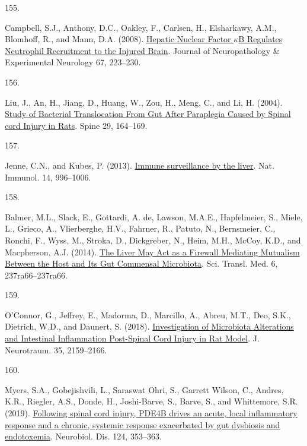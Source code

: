 \documentclass[
]{article}
\newlength{\cslhangindent}
\newlength{\csllabelwidth}
\newlength{\cslentryspacingunit} %
\newenvironment{CSLReferences}[2] %
 {%
  \setlength{\parindent}{0pt}
  \ifodd #1
  \let\oldpar\par
  \def\par{\hangindent=\cslhangindent\oldpar}
  \fi
  \setlength{\parskip}{#2\cslentryspacingunit}
 }%
 {}
\newcommand{\CSLLeftMargin}[1]{\parbox[t]{\csllabelwidth}{#1}}
\newcommand{\CSLRightInline}[1]{\parbox[t]{\linewidth - \csllabelwidth}{#1}\break}
\begin{document}
\begin{CSLReferences}{0}{0}
\leavevmode{}%
\CSLLeftMargin{155. }
\CSLRightInline{Campbell, S.J., Anthony, D.C., Oakley, F., Carlsen, H., Elsharkawy, A.M., Blomhoff, R., and Mann, D.A. (2008). \href{https://doi.org/10.1097/NEN.0b013e3181654957}{Hepatic {Nuclear Factor \(\kappa\)B Regulates Neutrophil Recruitment} to the {Injured Brain}}. Journal of Neuropathology \& Experimental Neurology 67, 223--230.}

\leavevmode{}%
\CSLLeftMargin{156. }
\CSLRightInline{Liu, J., An, H., Jiang, D., Huang, W., Zou, H., Meng, C., and Li, H. (2004). \href{https://doi.org/10.1097/01.BRS.0000107234.74249.CD}{Study of {Bacterial Translocation From Gut After Paraplegia Caused} by {Spinal} cord {Injury} in {Rats}}. Spine 29, 164--169.}

\leavevmode{}%
\CSLLeftMargin{157. }
\CSLRightInline{Jenne, C.N., and Kubes, P. (2013). \href{https://doi.org/10.1038/ni.2691}{Immune surveillance by the liver}. Nat. Immunol. 14, 996--1006.}

\leavevmode{}%
\CSLLeftMargin{158. }
\CSLRightInline{Balmer, M.L., Slack, E., Gottardi, A. de, Lawson, M.A.E., Hapfelmeier, S., Miele, L., Grieco, A., Vlierberghe, H.V., Fahrner, R., Patuto, N., Bernsmeier, C., Ronchi, F., Wyss, M., Stroka, D., Dickgreber, N., Heim, M.H., McCoy, K.D., and Macpherson, A.J. (2014). \href{https://doi.org/10.1126/scitranslmed.3008618}{The {Liver May Act} as a {Firewall Mediating Mutualism Between} the {Host} and {Its Gut Commensal Microbiota}}. Sci. Transl. Med. 6, 237ra66--237ra66.}

\leavevmode{}%
\CSLLeftMargin{159. }
\CSLRightInline{O'Connor, G., Jeffrey, E., Madorma, D., Marcillo, A., Abreu, M.T., Deo, S.K., Dietrich, W.D., and Daunert, S. (2018). \href{https://doi.org/10.1089/neu.2017.5349}{Investigation of {Microbiota Alterations} and {Intestinal Inflammation Post-Spinal Cord Injury} in {Rat Model}}. J. Neurotraum. 35, 2159--2166.}

\leavevmode{}%
\CSLLeftMargin{160. }
\CSLRightInline{Myers, S.A., Gobejishvili, L., Saraswat Ohri, S., Garrett Wilson, C., Andres, K.R., Riegler, A.S., Donde, H., Joshi-Barve, S., Barve, S., and Whittemore, S.R. (2019). \href{https://doi.org/10.1016/j.nbd.2018.12.008}{Following spinal cord injury, {PDE4B} drives an acute, local inflammatory response and a chronic, systemic response exacerbated by gut dysbiosis and endotoxemia}. Neurobiol. Dis. 124, 353--363.}


\end{CSLReferences}
\end{document}
